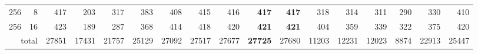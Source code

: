 \begin{table}[t]
\begin{tabular}{rr r rrrrrrrrrrrrrr}
256 & 8 & 417 & 203 & 317 & 383 & 408 & 415 & 416 & \textbf{417} & \textbf{417} & 318 & 314 & 311 & 290 & 330 & 410 \\
256 & 16 & 423 & 189 & 287 & 368 & 414 & 418 & 420 & \textbf{421} & \textbf{421} & 404 & 359 & 339 & 322 & 375 & 420 \\
\midrule
\multicolumn{2}{r}{total} & 27851 & 17431 & 21757 & 25129 & 27092 & 27517 & 27677 & \textbf{27725} & 27680 & 11203 & 12231 & 12023 & 8874 & 22913 & 25447 \\
\bottomrule
\end{tabular}
\end{table}
